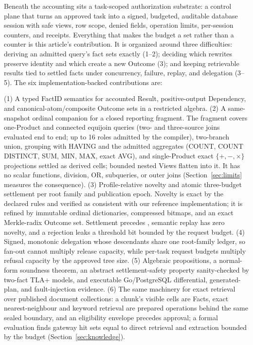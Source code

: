 \documentclass[10pt,journal,compsoc]{IEEEtran}
\newcommand{\code}[1]{\texttt{\detokenize{#1}}}
\begin{document}
Beneath the accounting sits a task-scoped authorization substrate: a control
plane that turns an approved task into a signed, budgeted, auditable database
session with safe views, row scope, denied fields, operation limits,
per-session counters, and receipts. Everything that makes the budget a set
rather than a counter is this article's contribution. It is organized
around three difficulties: deriving an admitted query's fact sets exactly (1--2);
deciding which rewrites preserve identity and which create a new Outcome
(3); and keeping retrievable results tied to settled facts under
concurrency, failure, replay, and delegation (3--5). The six
implementation-backed contributions are:

(1) A typed FactID semantics for accounted Result, positive-output
Dependency, and canonical-atom/composite Outcome sets in a restricted
algebra. (2) A same-snapshot ordinal companion for a closed reporting
fragment. The fragment covers one-Product and connected equijoin queries
(two- and three-source joins evaluated end to end; up to 16 roles admitted
by the compiler), two-branch
union, grouping with HAVING and the admitted aggregates (COUNT, COUNT
DISTINCT, SUM, MIN, MAX, exact AVG), and single-Product exact
$\{+,-,\times\}$ projections settled as derived cells; bounded
nested Views flatten into it. It has no scalar functions, division, OR,
subqueries, or outer joins (Section~\ref{sec:limits} measures the
consequence). (3) Profile-relative novelty and atomic three-budget
settlement per root family and publication epoch. Novelty is exact by the
declared rules and verified as consistent with our reference implementation;
it is refined by immutable ordinal dictionaries, compressed bitmaps, and an
exact Merkle-radix Outcome set. Settlement precedes \code{AVAILABLE},
semantic replay has zero novelty, and a rejection leaks a threshold bit
bounded by the request budget. (4) Signed, monotonic delegation whose
descendants share one root-family ledger, so fan-out cannot multiply
release capacity, while per-task request budgets multiply refusal capacity
by the approved tree size. (5) Algebraic
propositions, a normal-form soundness theorem, an abstract settlement-safety
property sanity-checked by two-fact TLA+ models, and executable
Go/PostgreSQL differential, generated-plan, and fault-injection evidence.
(6) The same machinery for exact retrieval over published document
collections: a chunk's visible cells are Facts, exact nearest-neighbour and
keyword retrieval are prepared operations behind the same sealed boundary, and an eligibility
envelope precedes approval; a formal evaluation finds gateway hit sets equal
to direct retrieval and extraction bounded by the budget
(Section~\ref{sec:knowledge}).
\end{document}
